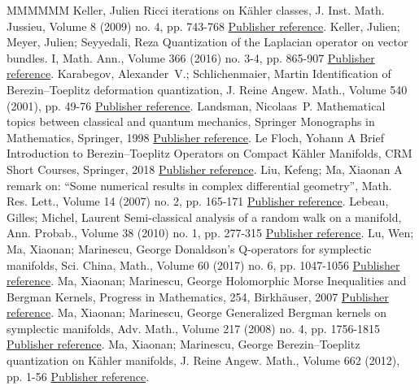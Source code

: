 \begin{thebibliography}{MMMMMM}
 Keller, Julien Ricci iterations on Kähler classes, J. Inst. Math. Jussieu, Volume 8 (2009) no. 4, pp. 743-768 \href{https://ahl.centre-mersenne.org/item/AHL_2020__3__1343_0/#Keller09}{Publisher reference}.
 Keller, Julien; Meyer, Julien; Seyyedali, Reza Quantization of the Laplacian operator on vector bundles. I, Math. Ann., Volume 366 (2016) no. 3-4, pp. 865-907 \href{https://ahl.centre-mersenne.org/item/AHL_2020__3__1343_0/#Keller16}{Publisher reference}.
 Karabegov, Alexander V.; Schlichenmaier, Martin Identification of Berezin–Toeplitz deformation quantization, J. Reine Angew. Math., Volume 540 (2001), pp. 49-76 \href{https://ahl.centre-mersenne.org/item/AHL_2020__3__1343_0/#KS01}{Publisher reference}.
 Landsman, Nicolaas P. Mathematical topics between classical and quantum mechanics, Springer Monographs in Mathematics, Springer, 1998 \href{https://ahl.centre-mersenne.org/item/AHL_2020__3__1343_0/#La}{Publisher reference}.
 Le Floch, Yohann A Brief Introduction to Berezin–Toeplitz Operators on Compact Kähler Manifolds, CRM Short Courses, Springer, 2018 \href{https://ahl.centre-mersenne.org/item/AHL_2020__3__1343_0/#LF}{Publisher reference}.
 Liu, Kefeng; Ma, Xiaonan A remark on: “Some numerical results in complex differential geometry”, Math. Res. Lett., Volume 14 (2007) no. 2, pp. 165-171 \href{https://ahl.centre-mersenne.org/item/AHL_2020__3__1343_0/#LM07}{Publisher reference}.
 Lebeau, Gilles; Michel, Laurent Semi-classical analysis of a random walk on a manifold, Ann. Probab., Volume 38 (2010) no. 1, pp. 277-315 \href{https://ahl.centre-mersenne.org/item/AHL_2020__3__1343_0/#LM}{Publisher reference}.
 Lu, Wen; Ma, Xiaonan; Marinescu, George Donaldson’s Q-operators for symplectic manifolds, Sci. China, Math., Volume 60 (2017) no. 6, pp. 1047-1056 \href{https://ahl.centre-mersenne.org/item/AHL_2020__3__1343_0/#LMM16}{Publisher reference}.
 Ma, Xiaonan; Marinescu, George Holomorphic Morse Inequalities and Bergman Kernels, Progress in Mathematics, 254, Birkhäuser, 2007 \href{https://ahl.centre-mersenne.org/item/AHL_2020__3__1343_0/#MM07}{Publisher reference}.
 Ma, Xiaonan; Marinescu, George Generalized Bergman kernels on symplectic manifolds, Adv. Math., Volume 217 (2008) no. 4, pp. 1756-1815 \href{https://ahl.centre-mersenne.org/item/AHL_2020__3__1343_0/#MM08}{Publisher reference}.
 Ma, Xiaonan; Marinescu, George Berezin–Toeplitz quantization on Kähler manifolds, J. Reine Angew. Math., Volume 662 (2012), pp. 1-56 \href{https://ahl.centre-mersenne.org/item/AHL_2020__3__1343_0/#MM12}{Publisher reference}.

\end{thebibliography}
